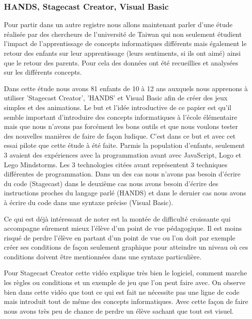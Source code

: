 \subsubsection{HANDS, Stagecast Creator, Visual Basic}

Pour partir dans un autre registre nous allons maintenant parler d'une étude réalisée par des chercheurs de l'université de Taiwan \cite{2} qui non seulement étudient l'impact de l'apprentissage de concepts informatiques différents mais également le retour des enfants sur leur apprentissage (leurs sentiments, si ils ont aimé) ainsi que le retour des parents. Pour cela des données ont été recueillies et analysées sur les différents concepts.

\newpage

Dans cette étude nous avons 81 enfants de 10 à 12 ans auxquels nous apprenons à utiliser 'Stagecast Creator', 'HANDS' et Visual Basic afin de créer des jeux simples et des animations. Le but et l'idée introductive de ce papier est qu'il semble important d'introduire des concepts informatiques à l'école élémentaire mais que nous n'avons pas forcément les bons outils et que nous voulons tester des nouvelles manières de faire de façon ludique. C'est dans ce but et avec cet essai pilote que cette étude à été faite. Parmis la population d'enfants, seulement 3 avaient des expériences avec la programmation avant avec JavaScript, Logo et Lego Mindstorms. Les 3 technologies citées avant représentent 3 techniques différentes de programmation. Dans un des cas nous n'avons pas besoin d'écrire du code (Stagecast) dans le deuxième cas nous avons besoin d'écrire des instructions proches du langage parlé (HANDS) et dans le dernier cas nous avons à écrire du code dans une syntaxe précise (Visual Basic).

Ce qui est déjà intéressant de noter est la montée de difficulté croissante qui accompagne sûrement mieux l'élève d'un point de vue pédagogique. Il est moins risqué de perdre l'élève en partant d'un point de vue ou l'on doit par exemple créer ses conditions de façon seulement graphique pour atteindre un niveau où ces conditions doivent être mentionnées dans une syntaxe particulière. 

Pour Stagecast Creator cette vidéo \cite{17} explique très bien le logiciel, comment marche les règles ou conditions et un exemple de jeu que l'on peut faire avec. On observe bien dans cette vidéo que tout ce qui est fait ne nécessite pas une ligne de code mais introduit tout de même des concepts informatiques. Avec cette façon de faire nous avons très peu de chance de perdre un élève sachant que tout est visuel.

